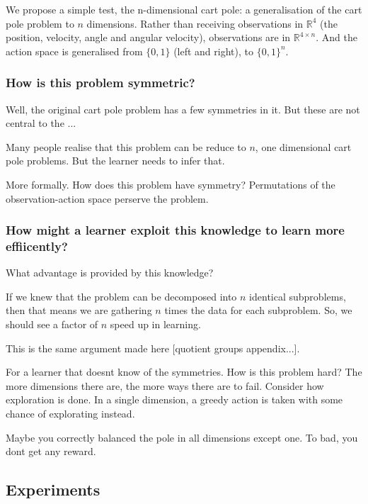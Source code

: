 We propose a simple test, the n-dimensional cart pole: a generalisation of the
cart pole problem to $n$ dimensions. Rather than receiving observations in
$\mathbb{R}^4$ (the position, velocity, angle and angular velocity), observations are
in $\mathbb{R}^{4\times n}$. And the action space is generalised from $\{0,1\}$ (left and right),
to $\{0,1\}^{n}$.

\cite{Brockman2016,baselines}


\subsubsection{How is this problem symmetric?}

Well, the original cart pole problem has a few symmetries in it. But these are
not central to the ...

Many people realise that this problem can be reduce to $n$, one dimensional cart pole problems.
But the learner needs to infer that.

More formally. How does this problem have symmetry?
Permutations of the observation-action space perserve the problem.

\subsubsection{How might a learner exploit this knowledge to learn more effiicently?}

What advantage is provided by this knowledge?

If we knew that the problem can be decomposed into $n$ identical subproblems,
then that means we are gathering $n$ times the data for each subproblem.
So, we should see a factor of $n$ speed up in learning.

This is the same argument made here [quotient groups appendix...].

For a learner that doesnt know of the symmetries. How is this problem hard?
The more dimensions there are, the more ways there are to fail.
Consider how exploration is done. In a single dimension, a greedy action is
taken with some chance of explorating instead.

Maybe you correctly balanced the pole in all dimensions except one. To bad, you dont get any reward.

\subsection{Experiments}


